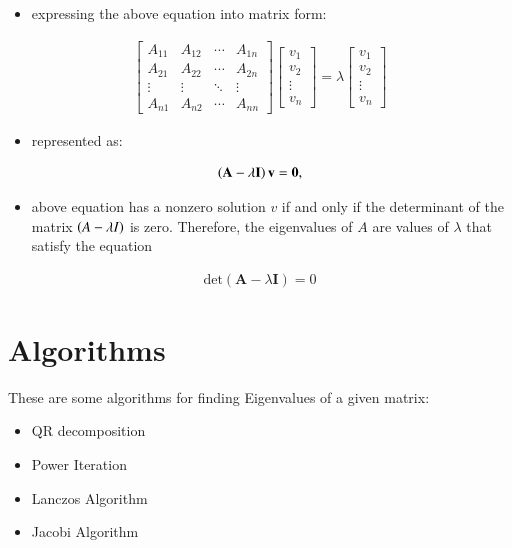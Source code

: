 \documentclass[journal]{IEEEtran}
\begin{document}
\begin{itemize}
    \item expressing the above equation into matrix form:
\end{itemize}
\begin{align*}
\begin{bmatrix}
A_{11} & A_{12} & \cdots & A_{1n} \\
A_{21} & A_{22} & \cdots & A_{2n} \\
\vdots & \vdots & \ddots & \vdots \\
A_{n1} & A_{n2} & \cdots & A_{nn}
\end{bmatrix}
\begin{bmatrix}
v_1 \\ 
v_2 \\ 
\vdots \\ 
v_n
\end{bmatrix}
=\lambda
\begin{bmatrix}
v_1 \\ 
v_2 \\ 
\vdots \\ 
v_n
\end{bmatrix}
\end{align*}
\begin{itemize}
    \item represented as:
\end{itemize}
\begin{align*}
    \left(\mathbf{A} - \lambda \mathbf{I}\right) \mathbf{v} = \mathbf{0},
\end{align*}
\begin{itemize}
    \item above equation has a nonzero solution $v$ if and only if the determinant of the matrix $\left(A-\lambda I\right)$ is zero. Therefore, the eigenvalues of $A$ are values of $\lambda$ that satisfy the equation
\end{itemize}

\begin{align*}
    \text{det}(\mathbf{A}-\lambda \mathbf{I})=0
\end{align*}
\section{Algorithms}
These are some algorithms for finding Eigenvalues of a given matrix:
\begin{itemize}
    \item QR decomposition
    \item Power Iteration
    \item Lanczos Algorithm
    \item Jacobi Algorithm
\end{itemize}
\end{document}
